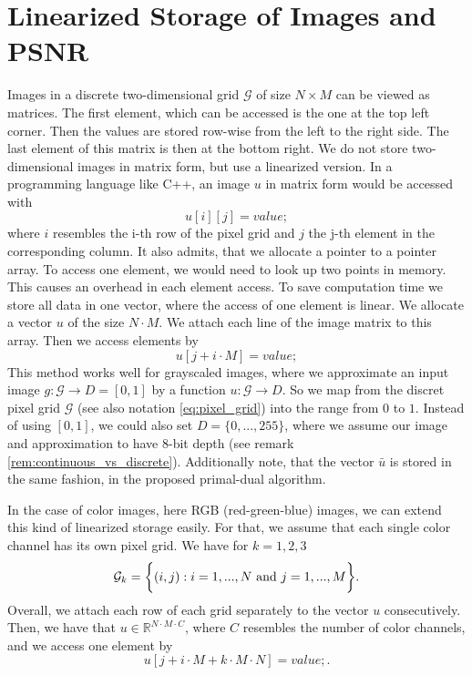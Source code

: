 \documentclass{scrreprt}
\begin{document}
    \section{Linearized Storage of Images and PSNR} %
    \label{sec:linearized_storage_of_images_and_psnr}
        
        Images in a discrete two-dimensional grid $\mathcal{G}$ of size $N \times M$ can be viewed as matrices. The first element, which can be accessed is the one at the top left corner. Then the values are stored row-wise from the left to the right side. The last element of this matrix is then at the bottom right. We do not store two-dimensional images in matrix form, but use a linearized version. In a programming language like C++, an image $u$ in matrix form would be accessed with
            $$
                u[i][j] = value;
            $$
        where $i$ resembles the i-th row of the pixel grid and $j$ the j-th element in the corresponding column. It also admits, that we allocate a pointer to a pointer array. To access one element, we would need to look up two points in memory. This causes an overhead in each element access. To save computation time we store all data in one vector, where the access of one element is linear. We allocate a vector $u$ of the size $N \cdot M$. We attach each line of the image matrix to this array. Then we access elements by
            $$
                u[j + i \cdot M] = value;
            $$
        This method works well for grayscaled images, where we approximate an input image $g: \mathcal{G} \longrightarrow D = [0, 1]$ by a function $u: \mathcal{G} \longrightarrow D$. So we map from the discret pixel grid $\mathcal{G}$ (see also notation \ref{eq:pixel_grid}) into the range from $0$ to $1$. Instead of using $[0, 1]$, we could also set $D = \{ 0, ..., 255 \}$, where we assume our image and approximation to have 8-bit depth (see remark \ref{rem:continuous_vs_discrete}). Additionally note, that the vector $\bar{u}$ is stored in the same fashion, in the proposed primal-dual algorithm.

        In the case of color images, here RGB (red-green-blue) images, we can extend this kind of linearized storage easily. For that, we assume that each single color channel has its own pixel grid. We have for $k = 1, 2, 3$
            \begin{equation}
                \mathcal{G}_{k} = \bigg\{ (i, j) : i = 1, ..., N \,\, \textnormal{and} \,\, j = 1, ..., M \bigg\}.
                \label{eq:color_pixel_grid}
            \end{equation}
        Overall, we attach each row of each grid separately to the vector $u$ consecutively. Then, we have that $u \in \mathbb{R}^{N \cdot M \cdot C}$, where $C$ resembles the number of color channels, and we access one element by
            $$
                u[j + i \cdot M + k \cdot M \cdot N] = value;.
            $$
\end{document}
